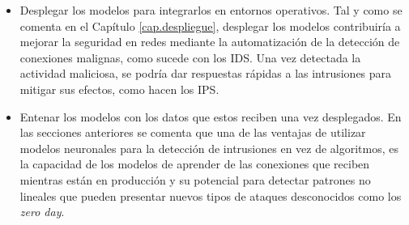 \begin{itemize}
	\item Desplegar los modelos para integrarlos en entornos operativos. Tal y como se comenta en el Capítulo \ref{cap.despliegue}, desplegar los modelos contribuiría a mejorar la seguridad en redes mediante la automatización de la detección de conexiones malignas, como sucede con los IDS. Una vez detectada la actividad maliciosa, se podría dar respuestas rápidas a las intrusiones para mitigar sus efectos, como hacen los IPS.
	
	\item Entenar los modelos con los datos que estos reciben una vez desplegados. En las secciones anteriores se comenta que una de las ventajas de utilizar modelos neuronales para la detección de intrusiones en vez de algoritmos, es la capacidad de los modelos de aprender de las conexiones que reciben mientras están en producción y su potencial para detectar patrones no lineales que pueden presentar nuevos tipos de ataques desconocidos como los \textit{zero day}.
	
\end{itemize}


